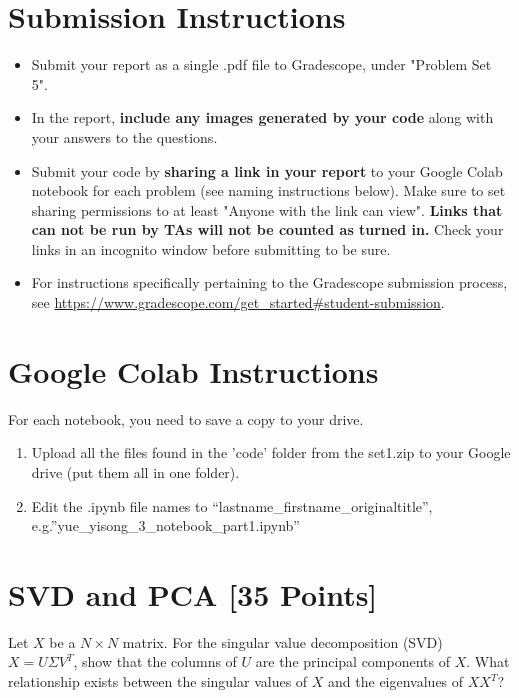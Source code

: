 \section*{Submission Instructions}

\begin{itemize}
  \item Submit your report as a single .pdf file to Gradescope, under "Problem Set 5".
	\item In the report, \textbf{include any images generated by your code} along with your answers to the questions.
	\item Submit your code by \textbf{sharing a link in your report} to your Google Colab notebook for each problem (see naming instructions below). Make sure to set sharing permissions to at least "Anyone with the link can view". \textbf{Links that can not be run by TAs will not be counted as turned in.} Check your links in an incognito window before submitting to be sure.
	\item For instructions specifically pertaining to the Gradescope submission process, see \url{https://www.gradescope.com/get_started#student-submission}.
\end{itemize}


\section*{Google Colab Instructions}
For each notebook, you need to save a copy to your drive.
\begin{enumerate}
	\item Upload all the files found in the 'code' folder from the set1.zip to your Google drive (put them all in one folder).
	\item Edit the .ipynb file names to “lastname_firstname_originaltitle”, e.g.”yue_yisong_3_notebook_part1.ipynb”
\end{enumerate}


\newpage
\section{SVD and PCA [35 Points]}

\problem[3] Let $X$ be a $N \times N$ matrix. For the singular value decomposition (SVD) $X = U \Sigma V^T$, show that the columns of $U$ are the principal components of $X$. What relationship exists between the singular values of $X$ and the eigenvalues of $XX^T$?

\begin{solution}
  \end{solution}

